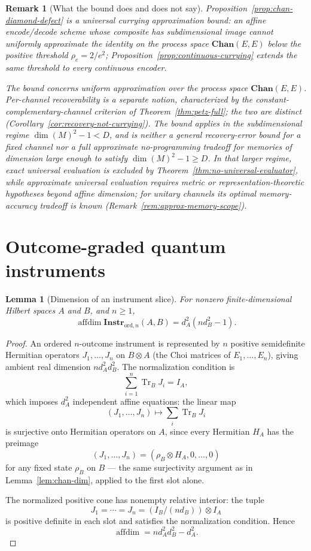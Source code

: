 \documentclass[11pt]{article}
\newtheorem{lemma}[theorem]{Lemma}
\newtheorem{remark}[theorem]{Remark}
\DeclareMathOperator{\affdim}{affdim}
\DeclareMathOperator{\Tr}{Tr}
\begin{document}
\begin{remark}[What the bound does and does not say]
\label{rem:diamond-bound-scope}
Proposition~\ref{prop:chan-diamond-defect} is a universal currying
approximation bound: an affine encode/decode scheme whose composite has
subdimensional image cannot uniformly approximate the identity on the process
space $\mathbf{Chan}(E,E)$ below the positive threshold $\rho_e=2/e^2$;
Proposition~\ref{prop:continuous-currying} extends the same threshold to every
continuous encoder.

The bound concerns uniform approximation over the process space
$\mathbf{Chan}(E,E)$. Per-channel recoverability is a separate notion,
characterized by the constant-complementary-channel criterion of
Theorem~\ref{thm:petz-full}; the two are distinct
(Corollary~\ref{cor:recovery-not-currying}). The bound applies in the
subdimensional regime $\dim(M)^2-1<D$, and is neither a general recovery-error
bound for a fixed channel nor a full approximate no-programming tradeoff for
memories of dimension large enough to satisfy $\dim(M)^2-1\ge D$. In that
larger regime, exact universal evaluation is excluded by
Theorem~\ref{thm:no-universal-evaluator}, while approximate universal
evaluation requires metric or representation-theoretic hypotheses beyond affine
dimension; for unitary channels its optimal memory-accuracy tradeoff is known
(Remark~\ref{rem:approx-memory-scope}).
\end{remark}
\section{Outcome-graded quantum instruments}
\label{sec:instr}

\begin{lemma}[Dimension of an instrument slice]
\label{lem:instr-dim}
For nonzero finite-dimensional Hilbert spaces $A$ and $B$, and $n\ge1$,
\[
\affdim\mathbf{Instr}_{\mathrm{ord},n}(A,B)
=
d_A^2(nd_B^2-1).
\]
\end{lemma}

\begin{proof}
An ordered $n$-outcome instrument is represented by $n$ positive
semidefinite Hermitian operators $J_1,\dots,J_n$ on $B\otimes A$ (the Choi
matrices of $E_1,\dots,E_n$), giving ambient real dimension
$nd_A^2d_B^2$. The normalization condition is
\[
\sum_{i=1}^n \Tr_B J_i=I_A,
\]
which imposes $d_A^2$ independent affine equations: the linear map
\[
(J_1,\dots,J_n)\longmapsto\sum_i\Tr_B J_i
\]
is surjective onto Hermitian operators on $A$, since every Hermitian $H_A$
has the preimage
\[
(J_1,\dots,J_n)=(\rho_B\otimes H_A,0,\dots,0)
\]
for any fixed state $\rho_B$ on $B$ --- the same surjectivity argument as in
Lemma~\ref{lem:chan-dim}, applied to the first slot alone.

The normalized positive cone has nonempty relative interior: the tuple
\[
J_1=\cdots=J_n=(I_B/(nd_B))\otimes I_A
\]
is positive definite in each slot and satisfies the normalization condition.
Hence
\[
\affdim=nd_A^2d_B^2-d_A^2.
\]
\end{proof}
\end{document}
